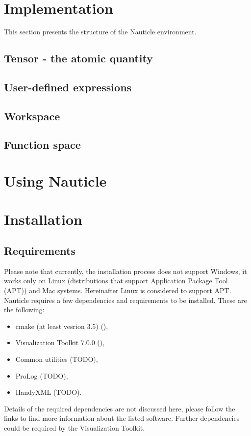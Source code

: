 \documentclass[a4paper,12pt,openany]{book}
\newcommand{\myhref}[3][nauticlegreen_dark]{\href{#2}{\color{#1}{#3}}}%
\theoremstyle{break}
\begin{document}
\section{Implementation}
This section presents the structure of the Nauticle environment.
\subsection{Tensor - the atomic quantity}
\subsection{User-defined expressions}
\subsection{Workspace}
\subsection{Function space}
\section{Using Nauticle}
\section{Installation}
\subsection{Requirements}
Please note that currently, the installation process does not support Windows, it works only on Linux (distributions that support Application Package Tool (APT)) and Mac systems.  Hereinafter Linux is considered to support APT.
Nauticle requires a few dependencies and requirements to be installed. These are the following:
\begin{itemize}
  \item cmake (at least vesrion 3.5) (\myhref{https://cmake.org/download/}{https://cmake.org/download/}),
  \item Visualization Toolkit 7.0.0 (\myhref{http://www.vtk.org/files/release/7.0/VTK-7.0.0.zip}{http://www.vtk.org/files/release/7.0/VTK-7.0.0.zip}),
  \item Common utilities (TODO),
  \item ProLog (TODO),
  \item HandyXML (TODO).
\end{itemize} 
Details of the required dependencies are not discussed here, please follow the links to find more information about the listed software. Further dependencies could be required by the Visualization Toolkit.
\end{document}
